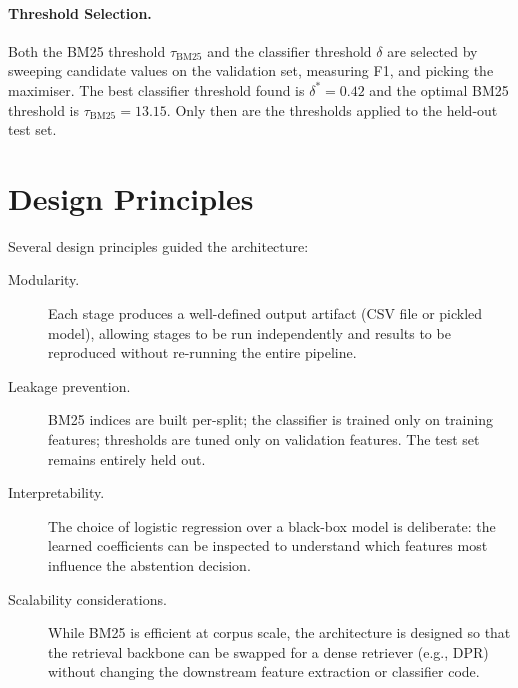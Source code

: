 \paragraph{Threshold Selection.}
Both the BM25 threshold $\tau_{\text{BM25}}$ and the classifier threshold $\delta$ are
selected by sweeping candidate values on the validation set, measuring F1, and
picking the maximiser. The best classifier threshold found is $\delta^* = 0.42$
and the optimal BM25 threshold is $\tau_{\text{BM25}} = 13.15$.
Only then are the thresholds applied to the held-out test set.

\section{Design Principles}
\label{sec:arch_principles}

Several design principles guided the architecture:

\begin{description}
  \item[Modularity.] Each stage produces a well-defined output artifact (CSV
        file or pickled model), allowing stages to be run independently and
        results to be reproduced without re-running the entire pipeline.

  \item[Leakage prevention.] BM25 indices are built per-split; the classifier
        is trained only on training features; thresholds are tuned only on
        validation features. The test set remains entirely held out.

  \item[Interpretability.] The choice of logistic regression over a black-box
        model is deliberate: the learned coefficients can be inspected to
        understand which features most influence the abstention decision.

  \item[Scalability considerations.] While BM25 is efficient at corpus scale,
        the architecture is designed so that the retrieval backbone can be
        swapped for a dense retriever (e.g., DPR) without changing the
        downstream feature extraction or classifier code.
\end{description}
